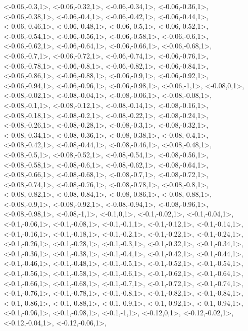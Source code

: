 \documentclass[a4paper,10pt]{article}
\begin{document}
\begin{eulernotebook}
\begin{euleroutput}
  <-0.06,-0.3,1>,
  <-0.06,-0.32,1>,
  <-0.06,-0.34,1>,
  <-0.06,-0.36,1>,
  <-0.06,-0.38,1>,
  <-0.06,-0.4,1>,
  <-0.06,-0.42,1>,
  <-0.06,-0.44,1>,
  <-0.06,-0.46,1>,
  <-0.06,-0.48,1>,
  <-0.06,-0.5,1>,
  <-0.06,-0.52,1>,
  <-0.06,-0.54,1>,
  <-0.06,-0.56,1>,
  <-0.06,-0.58,1>,
  <-0.06,-0.6,1>,
  <-0.06,-0.62,1>,
  <-0.06,-0.64,1>,
  <-0.06,-0.66,1>,
  <-0.06,-0.68,1>,
  <-0.06,-0.7,1>,
  <-0.06,-0.72,1>,
  <-0.06,-0.74,1>,
  <-0.06,-0.76,1>,
  <-0.06,-0.78,1>,
  <-0.06,-0.8,1>,
  <-0.06,-0.82,1>,
  <-0.06,-0.84,1>,
  <-0.06,-0.86,1>,
  <-0.06,-0.88,1>,
  <-0.06,-0.9,1>,
  <-0.06,-0.92,1>,
  <-0.06,-0.94,1>,
  <-0.06,-0.96,1>,
  <-0.06,-0.98,1>,
  <-0.06,-1,1>,
  <-0.08,0,1>,
  <-0.08,-0.02,1>,
  <-0.08,-0.04,1>,
  <-0.08,-0.06,1>,
  <-0.08,-0.08,1>,
  <-0.08,-0.1,1>,
  <-0.08,-0.12,1>,
  <-0.08,-0.14,1>,
  <-0.08,-0.16,1>,
  <-0.08,-0.18,1>,
  <-0.08,-0.2,1>,
  <-0.08,-0.22,1>,
  <-0.08,-0.24,1>,
  <-0.08,-0.26,1>,
  <-0.08,-0.28,1>,
  <-0.08,-0.3,1>,
  <-0.08,-0.32,1>,
  <-0.08,-0.34,1>,
  <-0.08,-0.36,1>,
  <-0.08,-0.38,1>,
  <-0.08,-0.4,1>,
  <-0.08,-0.42,1>,
  <-0.08,-0.44,1>,
  <-0.08,-0.46,1>,
  <-0.08,-0.48,1>,
  <-0.08,-0.5,1>,
  <-0.08,-0.52,1>,
  <-0.08,-0.54,1>,
  <-0.08,-0.56,1>,
  <-0.08,-0.58,1>,
  <-0.08,-0.6,1>,
  <-0.08,-0.62,1>,
  <-0.08,-0.64,1>,
  <-0.08,-0.66,1>,
  <-0.08,-0.68,1>,
  <-0.08,-0.7,1>,
  <-0.08,-0.72,1>,
  <-0.08,-0.74,1>,
  <-0.08,-0.76,1>,
  <-0.08,-0.78,1>,
  <-0.08,-0.8,1>,
  <-0.08,-0.82,1>,
  <-0.08,-0.84,1>,
  <-0.08,-0.86,1>,
  <-0.08,-0.88,1>,
  <-0.08,-0.9,1>,
  <-0.08,-0.92,1>,
  <-0.08,-0.94,1>,
  <-0.08,-0.96,1>,
  <-0.08,-0.98,1>,
  <-0.08,-1,1>,
  <-0.1,0,1>,
  <-0.1,-0.02,1>,
  <-0.1,-0.04,1>,
  <-0.1,-0.06,1>,
  <-0.1,-0.08,1>,
  <-0.1,-0.1,1>,
  <-0.1,-0.12,1>,
  <-0.1,-0.14,1>,
  <-0.1,-0.16,1>,
  <-0.1,-0.18,1>,
  <-0.1,-0.2,1>,
  <-0.1,-0.22,1>,
  <-0.1,-0.24,1>,
  <-0.1,-0.26,1>,
  <-0.1,-0.28,1>,
  <-0.1,-0.3,1>,
  <-0.1,-0.32,1>,
  <-0.1,-0.34,1>,
  <-0.1,-0.36,1>,
  <-0.1,-0.38,1>,
  <-0.1,-0.4,1>,
  <-0.1,-0.42,1>,
  <-0.1,-0.44,1>,
  <-0.1,-0.46,1>,
  <-0.1,-0.48,1>,
  <-0.1,-0.5,1>,
  <-0.1,-0.52,1>,
  <-0.1,-0.54,1>,
  <-0.1,-0.56,1>,
  <-0.1,-0.58,1>,
  <-0.1,-0.6,1>,
  <-0.1,-0.62,1>,
  <-0.1,-0.64,1>,
  <-0.1,-0.66,1>,
  <-0.1,-0.68,1>,
  <-0.1,-0.7,1>,
  <-0.1,-0.72,1>,
  <-0.1,-0.74,1>,
  <-0.1,-0.76,1>,
  <-0.1,-0.78,1>,
  <-0.1,-0.8,1>,
  <-0.1,-0.82,1>,
  <-0.1,-0.84,1>,
  <-0.1,-0.86,1>,
  <-0.1,-0.88,1>,
  <-0.1,-0.9,1>,
  <-0.1,-0.92,1>,
  <-0.1,-0.94,1>,
  <-0.1,-0.96,1>,
  <-0.1,-0.98,1>,
  <-0.1,-1,1>,
  <-0.12,0,1>,
  <-0.12,-0.02,1>,
  <-0.12,-0.04,1>,
  <-0.12,-0.06,1>,

\end{euleroutput}
\end{eulernotebook}
\end{document}
